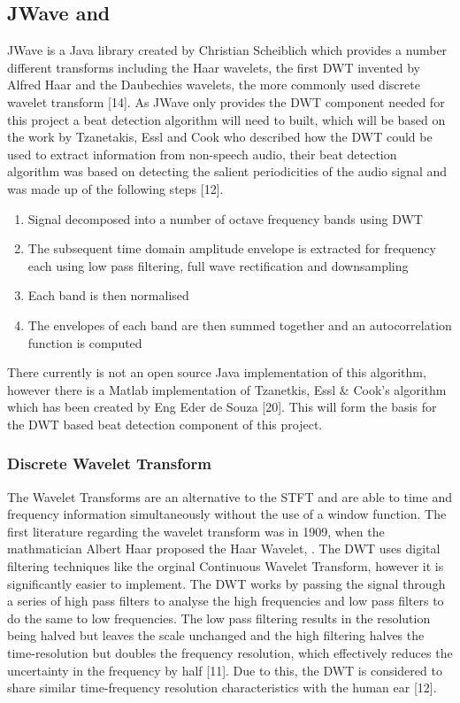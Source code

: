 \documentclass[a4paper, 11pt]{article}
\begin{document}
\subsection{JWave and }
JWave is a Java library created by Christian Scheiblich which provides a number different transforms including the Haar wavelets, the first DWT invented by Alfred Haar and the Daubechies wavelets, the more commonly used discrete wavelet transform [14]. As JWave only provides the DWT component needed for this project a beat detection algorithm will need to built, which will be based on the work by Tzanetakis, Essl and Cook who described how the DWT could be used to extract information from non-speech audio, their beat detection algorithm was based on detecting the salient periodicities of the audio signal and was made up of the following steps [12]. 

\begin{enumerate}
\item Signal decomposed into a number of octave frequency bands using DWT
\item The subsequent time domain amplitude envelope is extracted for frequency each using low pass filtering, full wave rectification and downsampling
\item Each band is then normalised
\item The envelopes of each band are then summed together and an autocorrelation function is computed
\end{enumerate}

There currently is not an open source Java implementation of this algorithm, however there is a Matlab implementation of Tzanetkis, Essl \& Cook's algorithm which has been created by Eng Eder de Souza [20]. This will form the basis for the DWT based beat detection component of this project.


\subsubsection{Discrete Wavelet Transform}
The Wavelet Transforms are an alternative to the STFT and are able to time and frequency information simultaneously without the use of a window function. The first literature regarding the wavelet transform was in 1909, when the mathmatician Albert Haar proposed the Haar Wavelet,  . The DWT uses digital filtering techniques like the orginal Continuous Wavelet Transform, however it is significantly easier to implement. The DWT works by passing the signal through a series of high pass filters to analyse the high frequencies and low pass filters to do the same to low frequencies. The low pass filtering results in the resolution being halved but leaves the scale unchanged and the high filtering halves the time-resolution but doubles the frequency resolution, which effectively reduces the uncertainty in the frequency by half [11]. Due to this, the DWT is considered to share similar time-frequency resolution characteristics with the human ear [12].
\end{document}
